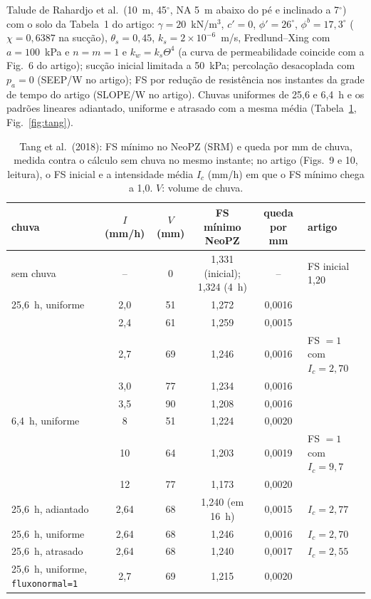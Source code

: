 Talude de Rahardjo et al.\ (10~m, 45$^\circ$, NA 5~m abaixo do p\'e e inclinado a 7$^\circ$) com o solo da Tabela~1 do
artigo: $\gamma=20$~kN/m$^3$, $c'=0$, $\phi'=26^\circ$, $\phi^b=17{,}3^\circ$ ($\chi=0{,}6387$ na suc\c{c}\~ao),
$\theta_s=0{,}45$, $k_s=2\times10^{-6}$~m/s, Fredlund--Xing com $a=100$~kPa e $n=m=1$ e $k_w=k_s\Theta^4$ (a curva de
permeabilidade coincide com a Fig.~6 do artigo); suc\c{c}\~ao inicial limitada a 50~kPa; percola\c{c}\~ao
desacoplada com $p_a=0$ (SEEP/W no artigo); FS por redu\c{c}\~ao de resist\^encia nos instantes da grade de tempo do
artigo (SLOPE/W no artigo). Chuvas uniformes de 25,6 e 6,4~h e os padr\~oes lineares adiantado, uniforme e atrasado
com a mesma m\'edia (Tabela~\ref{tab:tang}, Fig.~\ref{fig:tang}).

\begin{table}[h!]
\centering\small
\caption{Tang et al.\ (2018): FS m\'inimo no NeoPZ (SRM) e queda por mm de chuva, medida contra o c\'alculo sem chuva
no mesmo instante; no artigo (Figs.~9 e 10, leitura), o FS inicial e a intensidade m\'edia $I_c$ (mm/h) em que o FS
m\'inimo chega a 1,0. $V$: volume de chuva.}\label{tab:tang}
\begin{tabular}{lccccl}
\toprule
chuva & $I$ (mm/h) & $V$ (mm) & FS m\'inimo NeoPZ & queda por mm & artigo\\
\midrule
sem chuva & -- & 0 & 1,331 (inicial); 1,324 (4~h) & -- & FS inicial 1,20\\
25,6~h, uniforme & 2,0 & 51 & 1,272 & 0,0016 & \\
 & 2,4 & 61 & 1,259 & 0,0015 & \\
 & 2,7 & 69 & 1,246 & 0,0016 & FS $=1$ com $I_c=2{,}70$\\
 & 3,0 & 77 & 1,234 & 0,0016 & \\
 & 3,5 & 90 & 1,208 & 0,0016 & \\
6,4~h, uniforme & 8 & 51 & 1,224 & 0,0020 & \\
 & 10 & 64 & 1,203 & 0,0019 & FS $=1$ com $I_c=9{,}7$\\
 & 12 & 77 & 1,173 & 0,0020 & \\
25,6~h, adiantado & 2,64 & 68 & 1,240 (em 16~h) & 0,0015 & $I_c=2{,}77$\\
25,6~h, uniforme & 2,64 & 68 & 1,246 & 0,0016 & $I_c=2{,}70$\\
25,6~h, atrasado & 2,64 & 68 & 1,240 & 0,0017 & $I_c=2{,}55$\\
\midrule
25,6~h, uniforme, \texttt{fluxonormal=1} & 2,7 & 69 & 1,215 & 0,0020 & \\
\bottomrule
\end{tabular}
\end{table}

